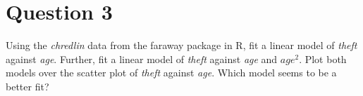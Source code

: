 \section{Question 3}

\begin{question}
    Using the \textit{chredlin} data from the faraway package in R, fit a linear model of \textit{theft} against \textit{age}. Further, fit a linear model of \textit{theft} against \textit{age} and $\textit{{age}}^2$. Plot both models over the scatter plot of \textit{theft} against \textit{age}. Which model seems to be a better fit?
\end{question}

\begin{answer}
    
\end{answer}
